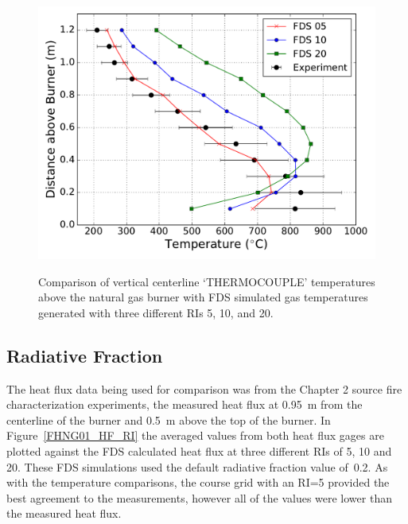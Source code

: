 \documentclass[twoside]{uocthesis}
\begin{document}
{\begin{figure}[h]
	\includegraphics[width=5in]{../Figures/FHNG01_RI_TC} \\
	\caption[Comparison of vertical centerline `THERMOCOUPLE' temperatures above the natural gas burner with FDS simulated gas temperatures.]{Comparison of vertical centerline `THERMOCOUPLE' temperatures above the natural gas burner with FDS simulated gas temperatures generated with three different RIs 5, 10, and 20.}
	\label{FHNG01_RI_TC}
\end{figure}

\subsection{Radiative Fraction}

The heat flux data being used for comparison was from the Chapter 2 source fire characterization experiments, the measured heat flux at 0.95~m from the centerline of the burner and 0.5~m above the top of the burner.  In Figure~\ref{FHNG01_HF_RI} the averaged values from both heat flux gages are plotted against the FDS calculated heat flux at three different RIs of 5, 10 and 20.  These FDS simulations used the default radiative fraction value of~0.2.  As with the temperature comparisons, the course grid with an RI=5 provided the best agreement to the measurements, however all of the values were lower than the measured heat flux.  

}
\end{document}
